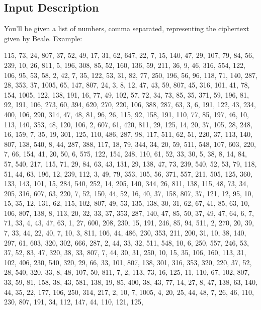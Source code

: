 \subsection{Input Description}\label{input-description-12}

You'll be given a list of numbers, comma separated, representing the
ciphertext given by Beale. Example:

115, 73, 24, 807, 37, 52, 49, 17, 31, 62, 647, 22, 7, 15, 140, 47, 29,
107, 79, 84, 56, 239, 10, 26, 811, 5, 196, 308, 85, 52, 160, 136, 59,
211, 36, 9, 46, 316, 554, 122, 106, 95, 53, 58, 2, 42, 7, 35, 122, 53,
31, 82, 77, 250, 196, 56, 96, 118, 71, 140, 287, 28, 353, 37, 1005, 65,
147, 807, 24, 3, 8, 12, 47, 43, 59, 807, 45, 316, 101, 41, 78, 154,
1005, 122, 138, 191, 16, 77, 49, 102, 57, 72, 34, 73, 85, 35, 371, 59,
196, 81, 92, 191, 106, 273, 60, 394, 620, 270, 220, 106, 388, 287, 63,
3, 6, 191, 122, 43, 234, 400, 106, 290, 314, 47, 48, 81, 96, 26, 115,
92, 158, 191, 110, 77, 85, 197, 46, 10, 113, 140, 353, 48, 120, 106, 2,
607, 61, 420, 811, 29, 125, 14, 20, 37, 105, 28, 248, 16, 159, 7, 35,
19, 301, 125, 110, 486, 287, 98, 117, 511, 62, 51, 220, 37, 113, 140,
807, 138, 540, 8, 44, 287, 388, 117, 18, 79, 344, 34, 20, 59, 511, 548,
107, 603, 220, 7, 66, 154, 41, 20, 50, 6, 575, 122, 154, 248, 110, 61,
52, 33, 30, 5, 38, 8, 14, 84, 57, 540, 217, 115, 71, 29, 84, 63, 43,
131, 29, 138, 47, 73, 239, 540, 52, 53, 79, 118, 51, 44, 63, 196, 12,
239, 112, 3, 49, 79, 353, 105, 56, 371, 557, 211, 505, 125, 360, 133,
143, 101, 15, 284, 540, 252, 14, 205, 140, 344, 26, 811, 138, 115, 48,
73, 34, 205, 316, 607, 63, 220, 7, 52, 150, 44, 52, 16, 40, 37, 158,
807, 37, 121, 12, 95, 10, 15, 35, 12, 131, 62, 115, 102, 807, 49, 53,
135, 138, 30, 31, 62, 67, 41, 85, 63, 10, 106, 807, 138, 8, 113, 20, 32,
33, 37, 353, 287, 140, 47, 85, 50, 37, 49, 47, 64, 6, 7, 71, 33, 4, 43,
47, 63, 1, 27, 600, 208, 230, 15, 191, 246, 85, 94, 511, 2, 270, 20, 39,
7, 33, 44, 22, 40, 7, 10, 3, 811, 106, 44, 486, 230, 353, 211, 200, 31,
10, 38, 140, 297, 61, 603, 320, 302, 666, 287, 2, 44, 33, 32, 511, 548,
10, 6, 250, 557, 246, 53, 37, 52, 83, 47, 320, 38, 33, 807, 7, 44, 30,
31, 250, 10, 15, 35, 106, 160, 113, 31, 102, 406, 230, 540, 320, 29, 66,
33, 101, 807, 138, 301, 316, 353, 320, 220, 37, 52, 28, 540, 320, 33, 8,
48, 107, 50, 811, 7, 2, 113, 73, 16, 125, 11, 110, 67, 102, 807, 33, 59,
81, 158, 38, 43, 581, 138, 19, 85, 400, 38, 43, 77, 14, 27, 8, 47, 138,
63, 140, 44, 35, 22, 177, 106, 250, 314, 217, 2, 10, 7, 1005, 4, 20, 25,
44, 48, 7, 26, 46, 110, 230, 807, 191, 34, 112, 147, 44, 110, 121, 125,

